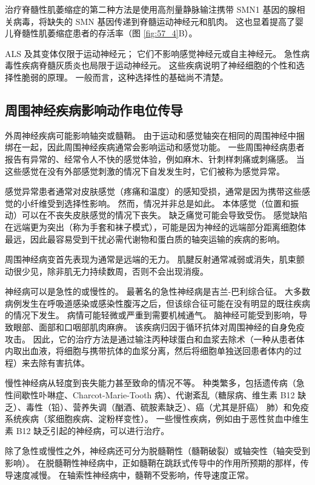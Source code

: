 治疗脊髓性肌萎缩症的第二种方法是使用高剂量静脉输注携带 SMN1 基因的腺相关病毒，将缺失的 SMN 基因传递到脊髓运动神经元和肌肉。 这也显着提高了婴儿脊髓性肌萎缩症患者的存活率（图 \ref{fig:57_4}B）。

ALS 及其变体仅限于运动神经元； 它们不影响感觉神经元或自主神经元。 急性病毒性疾病脊髓灰质炎也局限于运动神经元。 这些疾病说明了神经细胞的个性和选择性脆弱的原理。 一般而言，这种选择性的基础尚不清楚。

\subsection{周围神经疾病影响动作电位传导}
外周神经疾病可能影响轴突或髓鞘。 由于运动和感觉轴突在相同的周围神经中捆绑在一起，因此周围神经疾病通常会影响运动和感觉功能。 一些周围神经病患者报告有异常的、经常令人不快的感觉体验，例如麻木、针刺样刺痛或刺痛感。 当这些感觉在没有外部感觉刺激的情况下自发发生时，它们被称为感觉异常。

感觉异常患者通常对皮肤感觉（疼痛和温度）的感知受损，通常是因为携带这些感觉的小纤维受到选择性影响。 然而，情况并非总是如此。 本体感觉（位置和振动）可以在不丧失皮肤感觉的情况下丧失。 缺乏痛觉可能会导致受伤。 感觉缺陷在远端更为突出（称为手套和袜子模式），可能是因为神经的远端部分距离细胞体最远，因此最容易受到干扰必需代谢物和蛋白质的轴突运输的疾病的影响。

周围神经病变首先表现为通常是远端的无力。 肌腱反射通常减弱或消失，肌束颤动很少见，除非肌无力持续数周，否则不会出现消瘦。

神经病可以是急性的或慢性的。 最著名的急性神经病是吉兰-巴利综合征。 大多数病例发生在呼吸道感染或感染性腹泻之后，但该综合征可能在没有明显的既往疾病的情况下发生。 病情可能轻微或严重到需要机械通气。 脑神经可能受到影响，导致眼部、面部和口咽部肌肉麻痹。 该疾病归因于循环抗体对周围神经的自身免疫攻击。 因此，它的治疗方法是通过输注丙种球蛋白和血浆去除术（一种从患者体内取出血液，将细胞与携带抗体的血浆分离，然后将细胞单独送回患者体内的过程）来去除有害抗体。

慢性神经病从轻度到丧失能力甚至致命的情况不等。 种类繁多，包括遗传病（急性间歇性卟啉症、Charcot-Marie-Tooth 病）、代谢紊乱（糖尿病、维生素 B12 缺乏）、毒性（铅）、营养失调（酗酒、硫胺素缺乏）、癌（尤其是肝癌） 肺）和免疫系统疾病（浆细胞疾病、淀粉样变性）。 一些慢性疾病，例如由于恶性贫血中维生素 B12 缺乏引起的神经病，可以进行治疗。

除了急性或慢性之外，神经病还可分为脱髓鞘性（髓鞘破裂）或轴突性（轴突受到影响）。 在脱髓鞘性神经病中，正如髓鞘在跳跃式传导中的作用所预期的那样，传导速度减慢。 在轴索性神经病中，髓鞘不受影响，传导速度正常。


